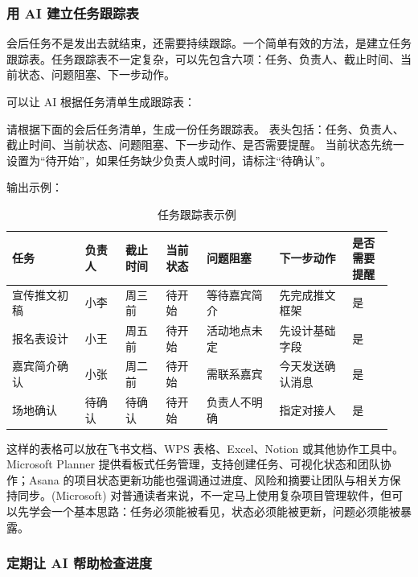 \subsubsection*{用 AI 建立任务跟踪表}

会后任务不是发出去就结束，还需要持续跟踪。一个简单有效的方法，是建立任务跟踪表。任务跟踪表不一定复杂，可以先包含六项：任务、负责人、截止时间、当前状态、问题阻塞、下一步动作。

可以让 AI 根据任务清单生成跟踪表：

\begin{tcolorbox}[promptbox]
请根据下面的会后任务清单，生成一份任务跟踪表。
表头包括：任务、负责人、截止时间、当前状态、问题阻塞、下一步动作、是否需要提醒。
当前状态先统一设置为“待开始”，如果任务缺少负责人或时间，请标注“待确认”。
\end{tcolorbox}

输出示例：

\begin{table}[H]
\centering
\caption{任务跟踪表示例}
\label{tab:task-tracking-example}
\begin{tabular}{p{0.18\linewidth} p{0.10\linewidth} p{0.10\linewidth} p{0.10\linewidth} p{0.18\linewidth} p{0.18\linewidth} p{0.10\linewidth}}
\toprule
\textbf{任务} & \textbf{负责人} & \textbf{截止时间} & \textbf{当前状态} & \textbf{问题阻塞} & \textbf{下一步动作} & \textbf{是否需要提醒} \\
\midrule
宣传推文初稿 & 小李 & 周三前 & 待开始 & 等待嘉宾简介 & 先完成推文框架 & 是 \\
报名表设计 & 小王 & 周五前 & 待开始 & 活动地点未定 & 先设计基础字段 & 是 \\
嘉宾简介确认 & 小张 & 周二前 & 待开始 & 需联系嘉宾 & 今天发送确认消息 & 是 \\
场地确认 & 待确认 & 待确认 & 待开始 & 负责人不明确 & 指定对接人 & 是 \\
\bottomrule
\end{tabular}
\end{table}

这样的表格可以放在飞书文档、WPS 表格、Excel、Notion 或其他协作工具中。Microsoft Planner 提供看板式任务管理，支持创建任务、可视化状态和团队协作；Asana 的项目状态更新功能也强调通过进度、风险和摘要让团队与相关方保持同步。(Microsoft) 对普通读者来说，不一定马上使用复杂项目管理软件，但可以先学会一个基本思路：任务必须能被看见，状态必须能被更新，问题必须能被暴露。

\subsubsection*{定期让 AI 帮助检查进度}


